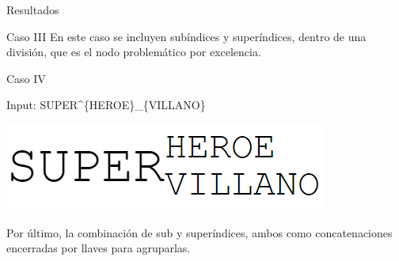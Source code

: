 \begin{section}{Resultados}
\begin{subsection}{Caso III}
En este caso se incluyen sub\'indices y super\'indices, dentro de una divisi\'on, que es el nodo problem\'atico por excelencia.

\end{subsection}
\begin{subsection}{Caso IV}

Input: SUPER\^{}\{HEROE\}\_\{VILLANO\}

\includegraphics[scale=0.5]{./imgs/super.png}

Por \'ultimo, la combinaci\'on de sub y super\'indices, ambos como concatenaciones encerradas por llaves para agruparlas.

\end{subsection}
\end{section}
